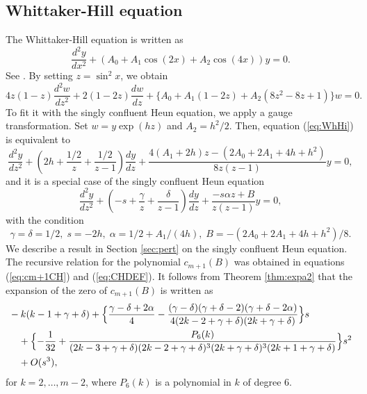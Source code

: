 \documentclass[12pt]{amsart}
\numberwithin{equation}{section}
\theoremstyle{definition}
\theoremstyle{remark}
\begin{document}
\subsection{Whittaker-Hill equation}
The Whittaker-Hill equation is written as
\begin{equation}
\frac{d^2y}{dx^2} + ( A_0 + A_1 \cos (2x) + A_2 \cos (4x) ) y=0 .
\label{eq:WhHi}
\end{equation}
See \cite{Ars}.
By setting $z = \sin ^2 x$, we obtain 
\begin{equation}
4z(1-z)\frac{d^2 w}{dz^2} + 2(1-2z) \frac{dw}{dz} + \{ A_0 + A_1 (1-2z) + A_2 (8 z^2 -8z +1 )  \} w =0 .
\end{equation}
To fit it with the singly confluent Heun equation, we apply a gauge transformation.
Set $w= y \exp (h z) $ and $A_2 =h^2/2$.
Then, equation (\ref{eq:WhHi}) is equivalent to
\begin{equation}
\frac{d^2y}{dz^2} + \left( 2h + \frac{1/2}{z}+\frac{1/2 }{z-1} \right) \frac{dy}{dz} +\frac{ 4( A_1 + 2h )z  -(2A_0 + 2A_1 + 4 h + h^2 )}{8 z(z-1)} y=0 ,
\end{equation}
and it is a special case of the singly confluent Heun equation
\begin{equation}
\frac{d^2y}{dz^2} + \left( -s + \frac{\gamma}{z}+\frac{\delta }{z-1} \right) \frac{dy}{dz} +\frac{-s \alpha z + B }{z(z-1)} y=0,
\end{equation}
with the condition
\begin{equation}
\gamma = \delta =1/2, \; s=-2h , \; \alpha = 1/2  +  A_1 /(4h) , \; B = -(2A_0 + 2A_1 + 4 h + h^2 )/8 .
\end{equation}
We describe a result in Section \ref{sec:pert} on the singly confluent Heun equation.
The recursive relation for the polynomial $c_{m+1} (B)$ was obtained in equations (\ref{eq:cm+1CH}) and (\ref{eq:CHDEF}).
It follows from Theorem \ref{thm:expa2} that the expansion of the zero of $c_{m+1} (B) $ is written as
\begin{align}
& -k(k-1+\gamma +\delta ) + \Bigl\{ \frac{\gamma -\delta +2 \alpha }{4} -\frac{(\gamma -\delta )(\gamma +\delta -2 )(\gamma +\delta -2 \alpha  ) }{4 (2 k-2+\gamma +\delta ) (2 k+\gamma +\delta )} \Bigr\} s \\
& \quad + \Bigl\{ - \frac{1}{32} + \frac{ P_6(k) }{(2 k-3+\gamma +\delta ) (2 k-2+\gamma +\delta )^3 (2 k+\gamma +\delta )^3  (2 k+1 +\gamma +\delta )  }  \Bigr\} s^2 \nonumber \\
& \quad + O(s^3) , \nonumber 
\end{align}
for $k=2,\dots , m-2$, where $P_6(k)$ is a polynomial in $k$ of degree $6$.
\end{document}
